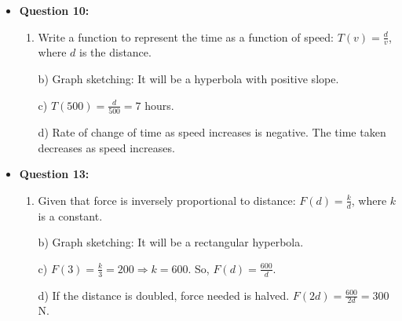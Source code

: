 \documentclass{article}
\begin{document}
\begin{itemize}
    \item \textbf{Question 10:}
    \begin{enumerate}[label=\alph*)]
        \item Write a function to represent the time as a function of speed: $T(v) = \frac{d}{v}$, where $d$ is the distance.
        \item[b)] Graph sketching: It will be a hyperbola with positive slope.
        \item[c)] $T(500) = \frac{d}{500} = 7$ hours.
        \item[d)] Rate of change of time as speed increases is negative. The time taken decreases as speed increases.
    \end{enumerate}
    
    \item \textbf{Question 13:}
    \begin{enumerate}[label=\alph*)]
        \item Given that force is inversely proportional to distance: $F(d) = \frac{k}{d}$, where $k$ is a constant.
        \item[b)] Graph sketching: It will be a rectangular hyperbola.
        \item[c)] $F(3) = \frac{k}{3} = 200 \Rightarrow k = 600$. So, $F(d) = \frac{600}{d}$.
        \item[d)] If the distance is doubled, force needed is halved. $F(2d) = \frac{600}{2d} = 300$N.
    \end{enumerate}
\end{itemize}
\end{document}
